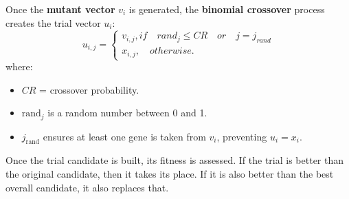 Once the \textbf{mutant vector} \( v_i \) is generated, the \textbf{binomial crossover} process creates the trial vector \( u_i \):
\[
u_{i,j} =
\left\{
\begin{array}{l}
    v_{i,j}, {if} \quad {rand}_j \leq CR \quad or \quad j = j_{rand}\\[5pt]
    x_{i,j}, {\quad otherwise.}
\end{array}
\right.
\]
where:
\begin{itemize}
    \item \( CR \) = crossover probability.
    \item \( \text{rand}_j \) is a random number between 0 and 1.
    \item \( j_{\text{rand}} \) ensures at least one gene is taken from \( v_i \), preventing \( u_i = x_i \).
\end{itemize}

Once the trial candidate is built, its fitness is assessed. If the trial is better than the original candidate, then it takes its place. If it is also better than the best overall candidate, it also replaces that.

